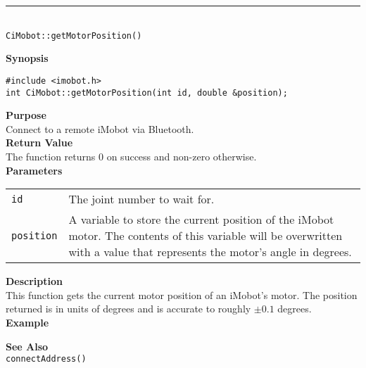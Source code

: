 \noindent
\vspace{5pt}
\rule{4.5in}{0.015in}\\
\noindent
{\LARGE \texttt{CiMobot::getMotorPosition()}}\\
{}

\noindent
{\bf Synopsis}\\
\begin{verbatim}
#include <imobot.h>
int CiMobot::getMotorPosition(int id, double &position);
\end{verbatim}

\noindent
{\bf Purpose}\\
Connect to a remote iMobot via Bluetooth.\\

\noindent
{\bf Return Value}\\
The function returns 0 on success and non-zero otherwise.\\

\noindent
{\bf Parameters}\\
\vspace{-0.1in}
\begin{description}
\item               
\begin{tabular}{p{20 mm}p{145 mm}}
\texttt{id} & The joint number to wait for. \\
\texttt{position} & A variable to store the current position of the iMobot
motor. The contents of this variable will be overwritten with a value that
represents the motor's angle in degrees.  \\
\end{tabular}
\end{description}

\noindent
{\bf Description}\\
This function gets the current motor position of an iMobot's motor. The
position returned is in units of degrees and is accurate to roughly $\pm0.1$
degrees. \\

\noindent
{\bf Example}\\
\noindent

\noindent
{\bf See Also}\\
\texttt{connectAddress()}

